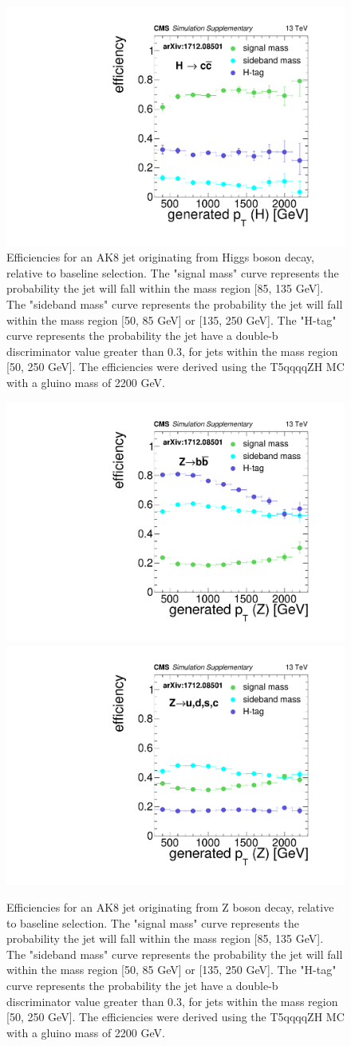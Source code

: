\begin{figure}
\includegraphics[width=0.45\linewidth]{figs/SUS17006/CMS-SUS-17-006_Figure-aux_010.pdf}
\caption{
Efficiencies for an AK8 jet originating from Higgs boson decay, relative to baseline selection.
The "signal mass" curve represents the probability the jet will fall within the mass region [85, 135 GeV].
The "sideband mass" curve represents the probability the jet will fall within the mass region [50, 85 GeV] or [135, 250 GeV].
The "H-tag" curve represents the probability the jet have a double-b discriminator value greater than 0.3, for jets within the mass region [50, 250 GeV].
The efficiencies were derived using the T5qqqqZH MC with a gluino mass of 2200 GeV.
}
\label{fig:effH}
\end{figure}

\begin{figure}
\centering
\includegraphics[width=0.45\linewidth]{figs/SUS17006/CMS-SUS-17-006_Figure-aux_011.pdf}
\includegraphics[width=0.45\linewidth]{figs/SUS17006/CMS-SUS-17-006_Figure-aux_012.pdf}\\
\caption{
Efficiencies for an AK8 jet originating from Z boson decay, relative to baseline selection.
The "signal mass" curve represents the probability the jet will fall within the mass region [85, 135 GeV].
The "sideband mass" curve represents the probability the jet will fall within the mass region [50, 85 GeV] or [135, 250 GeV].
The "H-tag" curve represents the probability the jet have a double-b discriminator value greater than 0.3, for jets within the mass region [50, 250 GeV].
The efficiencies were derived using the T5qqqqZH MC with a gluino mass of 2200 GeV.
}
\label{fig:effZ}
\end{figure}

